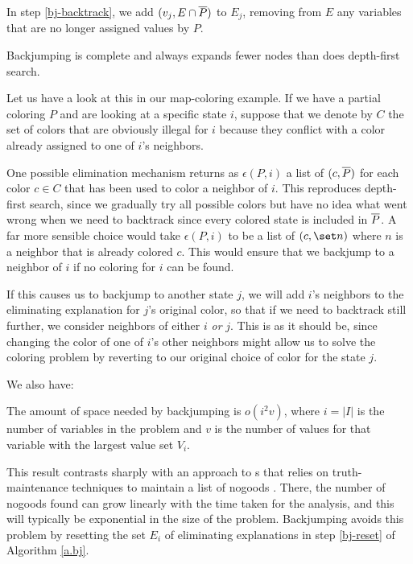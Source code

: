 In step \ref{bj-backtrack}, we add $(v_j,E\cap \overline P)$ to $E_j$,
removing from $E$ any variables that are no longer assigned values by
$P$.

\begin{proposition} Backjumping is complete and always expands fewer
nodes than does depth-first search.
 \label{p.bj}
 \label{old.5}
 \end{proposition}

Let us have a look at this in our map-coloring example.  If we have a
partial coloring $P$ and are looking at a specific state $i$, suppose
that we denote by $C$ the set of colors that are obviously illegal
for $i$ because they conflict with a color already assigned to one
of $i$'s neighbors.

One possible elimination mechanism returns as $\epsilon(P,i)$ a list
of $(c,\overline P)$ for each color $c\in C$ that has been used to color a
neighbor of $i$.  This reproduces depth-first search, since we
gradually try all possible colors but have no idea what went wrong
when we need to backtrack since every colored state is included in
$\overline P$.  A far more sensible choice would take $\epsilon(P,i)$ to be
a list of $(c,\set n)$ where $n$ is a neighbor that is already colored
$c$.  This would ensure that we backjump to a neighbor of $i$ if no
coloring for $i$ can be found.

If this causes us to backjump to another state $j$, we will add $i$'s
neighbors to the eliminating explanation for $j$'s original color, so
that if we need to backtrack still further, we consider neighbors of
either $i$ {\em or\/} $j$.  This is as it should be, since changing
the color of one of $i$'s other neighbors might allow us to solve the
coloring problem by reverting to our original choice of color for the
state $j$.

We also have:

\begin{proposition} The amount of space needed by backjumping is
$o(i^2v)$, where $i=|I|$ is the number of variables in the problem and
$v$ is the number of values for that variable with the largest value
set $V_i$.
 \label{p.space}
 \label{old.6}
 \end{proposition}

This result contrasts sharply with an approach to \csp s that relies
on truth-maintenance techniques to maintain a list of nogoods
\cite{deKleer:atms}.  There, the number of nogoods found can grow
linearly with the time taken for the analysis, and this will typically
be exponential in the size of the problem.  Backjumping avoids this
problem by resetting the set $E_i$ of eliminating explanations in step
\ref{bj-reset} of Algorithm \ref{a.bj}.

